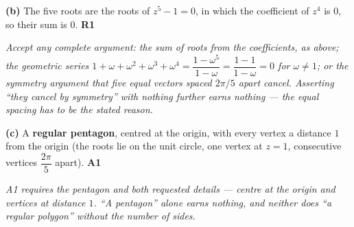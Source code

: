 \documentclass[12pt, twoside]{article}
\begin{document}
\begin{enumerate}[itemsep=0.3cm]
\textbf{(b)} The five roots are the roots of $z^{5} - 1 = 0$, in which the
coefficient of $z^{4}$ is $0$, so their sum is $0$. \hfill \textbf{R1}

\emph{Accept any complete argument: the sum of roots from the coefficients, as
above; the geometric series
$1 + \omega + \omega^{2} + \omega^{3} + \omega^{4}
= \dfrac{1 - \omega^{5}}{1 - \omega} = \dfrac{1 - 1}{1 - \omega} = 0$ for
$\omega \neq 1$; or the symmetry argument that five equal vectors spaced
$2\pi/5$ apart cancel. Asserting ``they cancel by symmetry'' with nothing
further earns nothing --- the equal spacing has to be the stated reason.}

\textbf{(c)} A \textbf{regular pentagon}, centred at the origin, with every
vertex a distance $1$ from the origin (the roots lie on the unit circle, one
vertex at $z = 1$, consecutive vertices $\dfrac{2\pi}{5}$ apart).
\hfill \textbf{A1}

\emph{A1 requires the pentagon \emph{and} both requested details --- centre at
the origin and vertices at distance $1$. ``A pentagon'' alone earns nothing,
and neither does ``a regular polygon'' without the number of sides.}

\end{enumerate}
\end{document}
